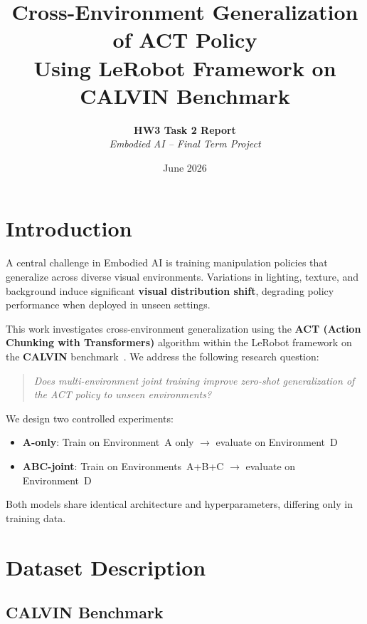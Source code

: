 \documentclass[10pt,twocolumn]{article}
\title{
    \textbf{Cross-Environment Generalization of ACT Policy} \\
    \large Using LeRobot Framework on CALVIN Benchmark
}
\author{
    \textbf{HW3 Task 2 Report} \\
    \textit{Embodied AI -- Final Term Project}
}
\date{June 2026}
\begin{document}
\maketitle

\section{Introduction}

A central challenge in Embodied AI is training manipulation policies that generalize across diverse visual environments. Variations in lighting, texture, and background induce significant \textbf{visual distribution shift}, degrading policy performance when deployed in unseen settings.

This work investigates cross-environment generalization using the \textbf{ACT (Action Chunking with Transformers)} algorithm within the LeRobot framework on the \textbf{CALVIN} benchmark~\cite{mees2022calvin}. We address the following research question:

\begin{quote}
\textit{Does multi-environment joint training improve zero-shot generalization of the ACT policy to unseen environments?}
\end{quote}

We design two controlled experiments:
\begin{itemize}[nosep]
    \item \textbf{A-only}: Train on Environment~A only $\rightarrow$ evaluate on Environment~D
    \item \textbf{ABC-joint}: Train on Environments~A+B+C $\rightarrow$ evaluate on Environment~D
\end{itemize}

Both models share identical architecture and hyperparameters, differing only in training data.

\section{Dataset Description}

\subsection{CALVIN Benchmark}
\end{document}
